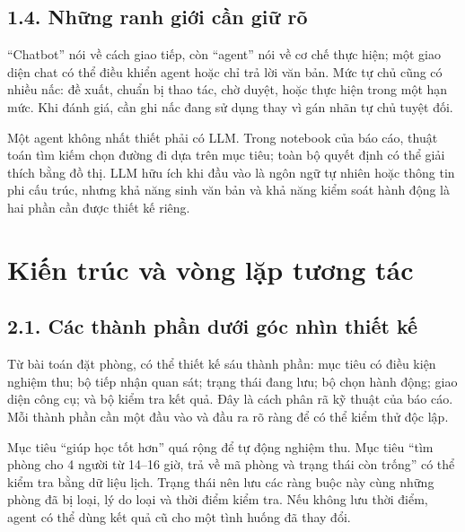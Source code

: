 \documentclass[11pt,a4paper]{article}
\begin{document}
\subsection{1.4. Những ranh giới cần giữ rõ}
``Chatbot'' nói về cách giao tiếp, còn ``agent'' nói về cơ chế thực hiện; một giao diện
chat có thể điều khiển agent hoặc chỉ trả lời văn bản. Mức tự chủ cũng có nhiều nấc:
đề xuất, chuẩn bị thao tác, chờ duyệt, hoặc thực hiện trong một hạn mức. Khi đánh giá,
cần ghi nấc đang sử dụng thay vì gán nhãn tự chủ tuyệt đối.

Một agent không nhất thiết phải có LLM. Trong notebook của báo cáo, thuật toán tìm kiếm
chọn đường đi dựa trên mục tiêu; toàn bộ quyết định có thể giải thích bằng đồ thị.
LLM hữu ích khi đầu vào là ngôn ngữ tự nhiên hoặc thông tin phi cấu trúc, nhưng khả năng
sinh văn bản và khả năng kiểm soát hành động là hai phần cần được thiết kế riêng.

\newpage
\section{Kiến trúc và vòng lặp tương tác}
\subsection{2.1. Các thành phần dưới góc nhìn thiết kế}
Từ bài toán đặt phòng, có thể thiết kế sáu thành phần: mục tiêu có điều kiện nghiệm thu;
bộ tiếp nhận quan sát; trạng thái đang lưu; bộ chọn hành động; giao diện công cụ;
và bộ kiểm tra kết quả. Đây là cách phân rã kỹ thuật của báo cáo. Mỗi thành phần cần
một đầu vào và đầu ra rõ ràng để có thể kiểm thử độc lập.

Mục tiêu ``giúp học tốt hơn'' quá rộng để tự động nghiệm thu. Mục tiêu ``tìm phòng cho
4 người từ 14--16 giờ, trả về mã phòng và trạng thái còn trống'' có thể kiểm tra bằng dữ
liệu lịch. Trạng thái nên lưu các ràng buộc này cùng những phòng đã bị loại, lý do loại
và thời điểm kiểm tra. Nếu không lưu thời điểm, agent có thể dùng kết quả cũ cho một
tình huống đã thay đổi.

\begin{center}
\end{center}
\end{document}
